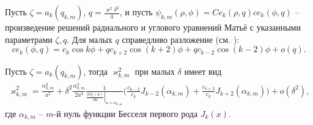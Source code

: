 Пусть $\zeta = a_k(q_{k, m})$, $q=\frac{\varkappa^2 \delta^2}{4}$, и пусть $\psi_{k,m}(\rho, \phi) = Ce_k(\rho, q)ce_k(\phi, q)$ -- произведение решений радиального и углового уравнений Матьё с указанными параметрами $\zeta, q$. Для малых $q$ справедливо разложение (см. \cite[\S~2.2, с.~122---124]{wref12}):
$$ce_k(\phi, q) = c_k \cos{k \phi} + q c_{k+2} \cos{(k+2) \phi} +q c_{k-2} \cos{(k-2) \phi} + o(q).$$ 
\begin{lemma}
Пусть $\zeta = a_k(q_{k, m})$, тогда $\varkappa_{k,m}^2$ при малых $\delta$ имеет вид
\begin{multline*}
\varkappa_{k, m}^2 = 
\frac{\alpha_{k, m}^2}{a^2} +  \delta^2 \frac{\alpha_{k, m}^3}{2 a^4}\frac{1}{\left.\frac{\partial J_{k} (u)}{\partial u}\right|_{u=\alpha_{k, m}}} 
\biggl(
\frac{c_{k-2}}{c_k} J_{k-2}(\alpha_{k, m}) + \frac{c_{k+2} }{c_k} J_{k+2}(\alpha_{k, m})
\biggr) + o(\delta^2),
\end{multline*}
где $\alpha_{k, m}$ -- $m$-й нуль функции Бесселя первого рода $J_{k}(x)$.
\label{th:lemEllipse1}
\end{lemma}
